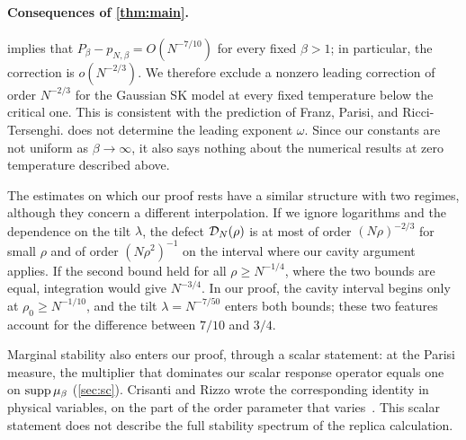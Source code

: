 \paragraph{Consequences of \cref{thm:main}.}
 implies that $P_\beta-p_{N,\beta}=O(N^{-7/10})$ for
every fixed $\beta>1$; in particular, the correction is $o(N^{-2/3})$. We therefore exclude a nonzero leading
correction of order $N^{-2/3}$ for the Gaussian SK model at every fixed
temperature below the critical one. This is
consistent with the prediction of Franz, Parisi, and Ricci-Tersenghi.
 does not determine the leading exponent $\omega$. Since our
constants are not uniform as $\beta\to\infty$, it also says nothing
about the numerical results at zero temperature described above.

The estimates on which our proof rests have a similar structure with
two regimes, although they concern a different interpolation. If we
ignore logarithms and the dependence on the tilt $\lambda$, the defect
$\mathcal D_N(\rho)$ is at most of order $(N\rho)^{-2/3}$ for small $\rho$
and of order $(N\rho^2)^{-1}$ on the interval where our cavity argument
applies. If the second bound held for all $\rho\ge N^{-1/4}$, where the
two bounds are equal, integration would give $N^{-3/4}$. In our proof,
the cavity interval begins only at $\rho_0\ge N^{-1/10}$, and the tilt
$\lambda=N^{-7/50}$ enters both bounds; these two features account for
the difference between $7/10$ and $3/4$.

Marginal stability also enters our proof, through a scalar statement:
at the Parisi measure, the multiplier that dominates our scalar response
operator equals one on $\operatorname{supp}\mu_\beta$ (\cref{sec:sc}). Crisanti and
Rizzo wrote the corresponding identity in physical variables, on the
part of the order parameter that
varies~\cite[Eqs.~(22)--(23)]{CrisantiRizzo2002}. This scalar statement
does not describe the full stability spectrum of the replica
calculation.

